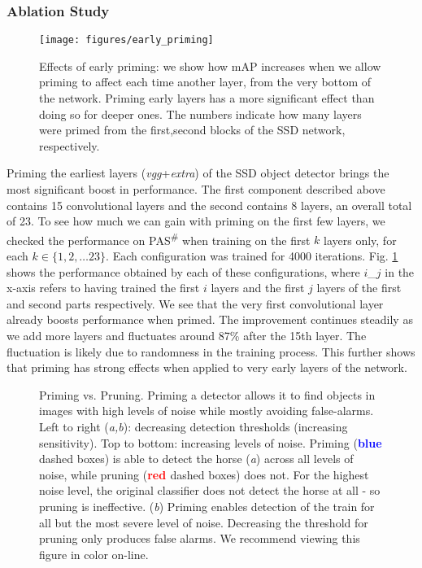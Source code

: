 \documentclass[10pt,letterpaper,twocolumn]{article}
\begin{document}
\subsubsection{Ablation Study}

\begin{figure}
\texttt{[image: figures/early\_priming]}

\caption{\label{fig:early-ablation}Effects of early priming: we show how mAP
increases when we allow priming to affect each time another layer,
from the very bottom of the network. Priming early layers has a more
significant effect than doing so for deeper ones. The numbers indicate
how many layers were primed from the first,second blocks of the SSD
network, respectively. }
\end{figure}

Priming the earliest layers (\emph{vgg}+\emph{extra}) of the SSD object
detector brings the most significant boost in performance. The first
component described above contains 15 convolutional layers and the
second contains 8 layers, an overall total of 23. To see how much
we can gain with priming on the first few layers, we checked the performance
on PAS\textsuperscript{\#} when training on the first $k$ layers
only, for each $k\in\{1,2,\dots23\}$. Each configuration was trained
for 4000 iterations. Fig. \ref{fig:early-ablation} shows the performance
obtained by each of these configurations, where $i$\_$j$ in the
x-axis refers to having trained the first $i$ layers and the first
$j$ layers of the first and second parts respectively. We see that
the very first convolutional layer already boosts performance when
primed. The improvement continues steadily as we add more layers and
fluctuates around 87\% after the 15th layer. The fluctuation is likely
due to randomness in the training process. This further shows that
priming has strong effects when applied to very early layers of the
network. 
\begin{figure*}
\begin{centering}
\par\end{centering}
\caption{\label{fig:Priming-vs.-Pruning.}Priming vs. Pruning. Priming a detector
allows it to find objects in images with high levels of noise while
mostly avoiding false-alarms. Left to right (\emph{a,b}): decreasing
detection thresholds (increasing sensitivity). Top to bottom: increasing
levels of noise. Priming (\textbf{\textcolor{blue}{blue}} dashed boxes)
is able to detect the horse (\emph{a}) across all levels of noise,
while pruning (\textbf{\textcolor{red}{red }}dashed boxes) does not.
For the highest noise level, the original classifier does not detect
the horse at all - so pruning is ineffective. (\emph{b}) Priming enables
detection of the train for all but the most severe level of noise.
Decreasing the threshold for pruning only produces false alarms. We
recommend viewing this figure in color on-line.}
\end{figure*}
\end{document}
